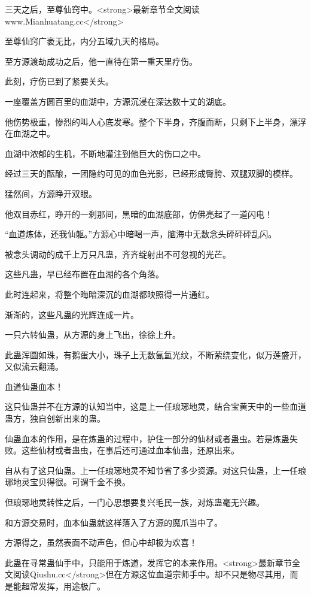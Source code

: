 
\begin{this_body}

三天之后，至尊仙窍中。<strong>最新章节全文阅读www.Mianhuatang.cc</strong>

至尊仙窍广袤无比，内分五域九天的格局。

至方源渡劫成功之后，他一直待在第一重天里疗伤。

此刻，疗伤已到了紧要关头。

一座覆盖方圆百里的血湖中，方源沉浸在深达数十丈的湖底。

他伤势极重，惨烈的叫人心底发寒。整个下半身，齐腹而断，只剩下上半身，漂浮在血湖之中。

血湖中浓郁的生机，不断地灌注到他巨大的伤口之中。

经过三天的酝酿，一团隐约可见的血色光影，已经形成臀胯、双腿双脚的模样。

猛然间，方源睁开双眼。

他双目赤红，睁开的一刹那间，黑暗的血湖底部，仿佛亮起了一道闪电！

“血道炼体，还我仙躯。”方源心中暗喝一声，脑海中无数念头砰砰砰乱闪。

被念头调动的成千上万只凡蛊，齐齐绽射出不可忽视的光芒。

这些凡蛊，早已经布置在血湖的各个角落。

此时连起来，将整个晦暗深沉的血湖都映照得一片通红。

渐渐的，这些凡蛊的光辉连成一片。

一只六转仙蛊，从方源的身上飞出，徐徐上升。

此蛊浑圆如珠，有鹅蛋大小，珠子上无数氤氲光纹，不断萦绕变化，似万莲盛开，又似流云翻涌。

血道仙蛊血本！

这只仙蛊并不在方源的认知当中，这是上一任琅琊地灵，结合宝黄天中的一些血道蛊方，独自创新出来的蛊。

仙蛊血本的作用，是在炼蛊的过程中，护住一部分的仙材或者蛊虫。若是炼蛊失败。这些仙材或者蛊虫，在事后还可通过血本仙蛊，还原出来。

自从有了这只仙蛊。上一任琅琊地灵不知节省了多少资源。对这只仙蛊，上一任琅琊地灵宝贝得很。可谓千金不换。

但琅琊地灵转性之后，一门心思想要复兴毛民一族，对炼蛊毫无兴趣。

和方源交易时，血本仙蛊就这样落入了方源的魔爪当中了。

方源得之，虽然表面不动声色，但心中却极为欢喜！

此蛊在寻常蛊仙手中，只能用于炼道，发挥它的本来作用。<strong>最新章节全文阅读Qiushu.cc</strong>但在方源这位血道宗师手中。却不只是物尽其用，而是能超常发挥，用途极广。


\end{this_body}
